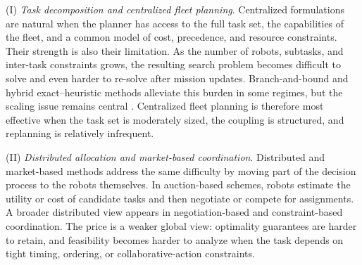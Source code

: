  (I) \emph{Task decomposition and centralized fleet planning}. Centralized
formulations are natural when the planner has access to the full task set, the
capabilities of the fleet, and a common model of cost, precedence, and resource
constraints.  Their strength is also their limitation. As the number of robots,
subtasks, and inter-task constraints grows, the resulting search problem becomes difficult
to solve and even harder to re-solve after mission updates. Branch-and-bound and hybrid
exact--heuristic methods alleviate this burden in some regimes, but the scaling issue
remains central \citep{martin2021mrta, athira2025systematic}. Centralized fleet planning is
therefore most effective when the task set is moderately sized, the coupling is
structured, and replanning is relatively infrequent.

 (II) \emph{Distributed allocation and market-based coordination}. Distributed
and market-based methods address the same difficulty by moving part of the decision
process to the robots themselves. In auction-based schemes, robots estimate the utility or
cost of candidate tasks and then negotiate or compete for assignments.  A broader
distributed view appears in negotiation-based and constraint-based coordination.
 The price is a weaker global view:
optimality guarantees are harder to retain, and feasibility becomes harder to analyze when
the task depends on tight timing, ordering, or collaborative-action constraints.

